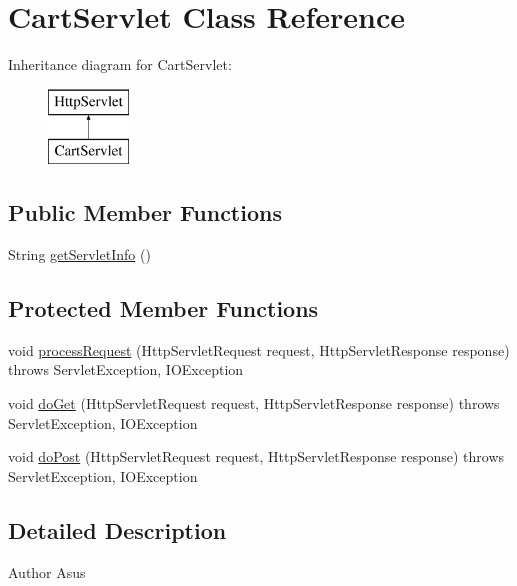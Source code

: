 \hypertarget{class_cart_servlet}{}\section{Cart\+Servlet Class Reference}
\label{class_cart_servlet}
Inheritance diagram for Cart\+Servlet\+:\begin{figure}[H]
\begin{center}
\leavevmode
\includegraphics[height=2.000000cm]{class_cart_servlet}
\end{center}
\end{figure}
\subsection*{Public Member Functions}
\begin{DoxyCompactItemize}
\item 
String \mbox{\hyperlink{class_cart_servlet_a143eb6e94e2ceb49bc82778649257cd4}{get\+Servlet\+Info}} ()
\end{DoxyCompactItemize}
\subsection*{Protected Member Functions}
\begin{DoxyCompactItemize}
\item 
void \mbox{\hyperlink{class_cart_servlet_a05df7d4c691e254beda6695575dcb683}{process\+Request}} (Http\+Servlet\+Request request, Http\+Servlet\+Response response)  throws Servlet\+Exception, I\+O\+Exception 
\item 
void \mbox{\hyperlink{class_cart_servlet_a79cf008fb01cd5bdf57b975bf9681ce9}{do\+Get}} (Http\+Servlet\+Request request, Http\+Servlet\+Response response)  throws Servlet\+Exception, I\+O\+Exception 
\item 
void \mbox{\hyperlink{class_cart_servlet_ab95c46b660679a6fdc55fd5888ea2cfa}{do\+Post}} (Http\+Servlet\+Request request, Http\+Servlet\+Response response)  throws Servlet\+Exception, I\+O\+Exception 
\end{DoxyCompactItemize}


\subsection{Detailed Description}
\begin{DoxyAuthor}{Author}
Asus 
\end{DoxyAuthor}


